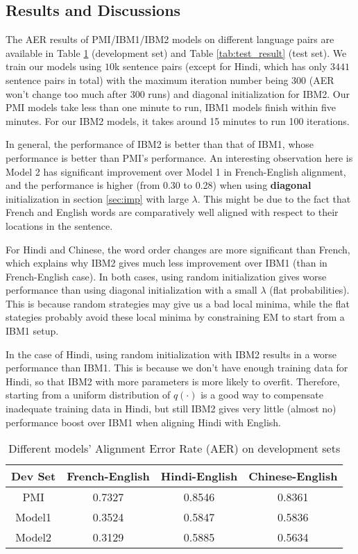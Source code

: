 \documentclass[letterpaper]{article}
\begin{document}
\subsection{Results and Discussions}\label{sec:result}
The AER results of PMI/IBM1/IBM2 models on different language pairs are available in Table \ref{tab:dev_result} (development set) and Table \ref{tab:test_result}  (test set). We train our models using $10$k sentence pairs (except for Hindi, which has only $3441$ sentence pairs in total) with the maximum iteration number being $300$ (AER won't change too much after $300$ runs) and diagonal initialization for IBM2.
Our PMI models take less than one minute to run, IBM1 models finish within five minutes. For our IBM2 models, it takes around 15 minutes to run 100 iterations.

In general, the performance of IBM2 is better than that of IBM1, whose performance is better than PMI's performance.
An interesting observation here is Model 2 has significant improvement over Model 1 in French-English alignment, and the performance is higher (from 0.30 to 0.28) when using \textbf{diagonal} initialization in section \ref{sec:imp} with large $\lambda$. This might be due to the fact that French and English words are comparatively well aligned with respect to their locations in the sentence.

For Hindi and Chinese, the word order changes are more significant than French, which explains why IBM2 gives much less improvement over IBM1 (than in French-English case). In both cases, using random initialization gives worse performance than using diagonal initialization with a small $\lambda$ (flat probabilities). This is because random strategies may give us a bad local minima, while the flat stategies probably avoid these local minima by constraining EM to start from a IBM1 setup.

In the case of Hindi, using random initialization with IBM2 results in a worse performance than IBM1. This is because we don't have enough training data for Hindi, so that IBM2 with more parameters is more likely to overfit.
Therefore, starting from a uniform distribution of $q(\cdot)$ is a good way to compensate inadequate training data in Hindi, but still IBM2 gives very little (almost no) performance boost over IBM1 when aligning Hindi with English.

\begin{table}
\begin{center}
\begin{tabular}{cccc}
\hline
\textbf{Dev Set} & French-English & Hindi-English & Chinese-English \\
\hline
PMI & 0.7327 & 0.8546 & 0.8361 \\
Model1 & 0.3524 &  0.5847 &  0.5836 \\
Model2 & 0.3129 & 0.5885 & 0.5634 \\
\hline
\end{tabular}
\caption{Different models' Alignment Error Rate (AER) on development sets}\label{tab:dev_result}
\end{center}
\end{table}
\end{document}
